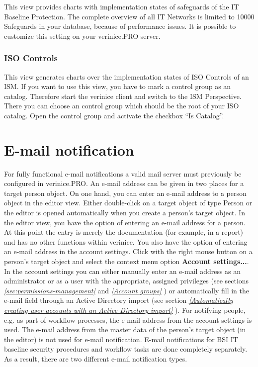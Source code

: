 \documentclass[a4paper,10pt]{book}
\begin{document}
This view provides charts with implementation states of safeguards of
the IT Baseline Protection. The complete overview of
all IT Networks is limited to 10000 Safeguards in your database,
because of performance issues. It is possible to customize this
setting on your verinice.PRO server.

\subsubsection{ISO Controls}
\label{sec:iso-controls}

This view generates charts over the implementation states of ISO
Controls of an ISM. If you want to use this view, you have to mark a
control group as an catalog. Therefore start the verinice client and
switch to the ISM Perspective. There you can choose an control group
which should be the root of your ISO catalog. Open the control group
and activate the checkbox ``Is Catalog''.

\section{E-mail notification} \label{sec:E-mail-notification}
For fully functional e-mail notifications a valid mail server must previously be configured in verinice.PRO.
\newline
An e-mail address can be given in two places for a target person object. On one hand, you can enter an e-mail address to a person object in the editor view. Either double-click on a target object of type Person or the editor is opened automatically when you create a person's target object.
In the editor view, you have the option of entering an e-mail address for a person. At this point the entry is merely the documentation (for example, in a report) and has no other functions within verinice. You also have the option of entering an e-mail address in the account settings. Click with the right mouse button on a person's target object and select the context menu option \textbf{Account settings...}.
In the account settings you can either manually enter an e-mail address as an administrator or as a user with the appropriate, assigned privileges (see sections {\em \ref{sec:permissions-management} } and {\em \ref{Account groups} }) or automatically fill in the e-mail field through an Active Directory import (see section {\em \ref{Automatically creating user accounts with an Active Directory import} }).
\newline
For notifying people, e.g. as part of workflow processes, the e-mail address from the account settings is used.
The e-mail address from the master data of the person's target object (in the editor) is not used for e-mail notification.
\newline
E-mail notifications for BSI IT baseline security procedures and workflow tasks are done completely separately.
As a result, there are two different e-mail notification types.
\newline
\end{document}
